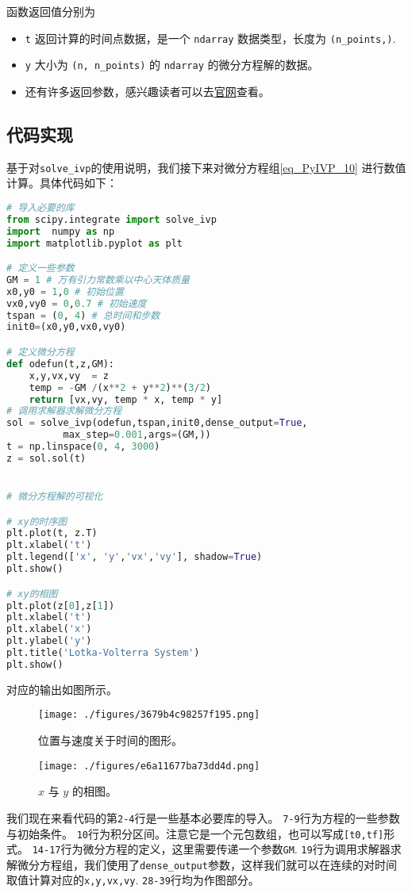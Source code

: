 函数返回值分别为
\begin{itemize}
\item  \verb|t| 返回计算的时间点数据，是一个 \verb|ndarray| 数据类型，长度为 \verb|(n_points,)|.
\item \verb|y| 大小为 \verb|(n, n_points)| 的 \verb|ndarray| 的微分方程解的数据。
\item 还有许多返回参数，感兴趣读者可以去\href{https://scipy.github.io/devdocs/reference/generated/scipy.integrate.solve_ivp.html#r179348322575-7}{官网}查看。
\end{itemize}


\subsection{代码实现}
基于对\verb|solve_ivp|的使用说明，我们接下来对微分方程组\ref{eq_PyIVP_10} 进行数值计算。具体代码如下：
\begin{lstlisting}[language=python]
# 导入必要的库
from scipy.integrate import solve_ivp
import  numpy as np
import matplotlib.pyplot as plt

# 定义一些参数
GM = 1 # 万有引力常数乘以中心天体质量
x0,y0 = 1,0 # 初始位置
vx0,vy0 = 0,0.7 # 初始速度
tspan = (0, 4) # 总时间和步数
init0=(x0,y0,vx0,vy0)

# 定义微分方程
def odefun(t,z,GM):
    x,y,vx,vy  = z
    temp = -GM /(x**2 + y**2)**(3/2)
    return [vx,vy, temp * x, temp * y]
# 调用求解器求解微分方程
sol = solve_ivp(odefun,tspan,init0,dense_output=True,
          max_step=0.001,args=(GM,))
t = np.linspace(0, 4, 3000)
z = sol.sol(t)


# 微分方程解的可视化

# xy的时序图
plt.plot(t, z.T)
plt.xlabel('t')
plt.legend(['x', 'y','vx','vy'], shadow=True)
plt.show()

# xy的相图
plt.plot(z[0],z[1])
plt.xlabel('t')
plt.xlabel('x')
plt.ylabel('y')
plt.title('Lotka-Volterra System')
plt.show()
\end{lstlisting}

对应的输出如图所示。
\begin{figure}[ht]
\centering
\texttt{[image: ./figures/3679b4c98257f195.png]}
\caption{位置与速度关于时间的图形。} \label{fig_PyIVP_1}
\end{figure}

\begin{figure}[ht]
\centering
\texttt{[image: ./figures/e6a11677ba73dd4d.png]}
\caption{$x$ 与 $y$ 的相图。} \label{fig_PyIVP_2}
\end{figure}

我们现在来看代码的第\verb|2-4|行是一些基本必要库的导入。 
\verb|7-9|行为方程的一些参数与初始条件。
\verb|10|行为积分区间。注意它是一个元包数组，也可以写成\verb|[t0,tf]|形式。
\verb|14-17|行为微分方程的定义，这里需要传递一个参数\verb|GM|.
\verb|19|行为调用求解器求解微分方程组，我们使用了\verb|dense_output|参数，这样我们就可以在连续的对时间取值计算对应的\verb|x,y,vx,vy|. 
\verb|28-39|行均为作图部分。
